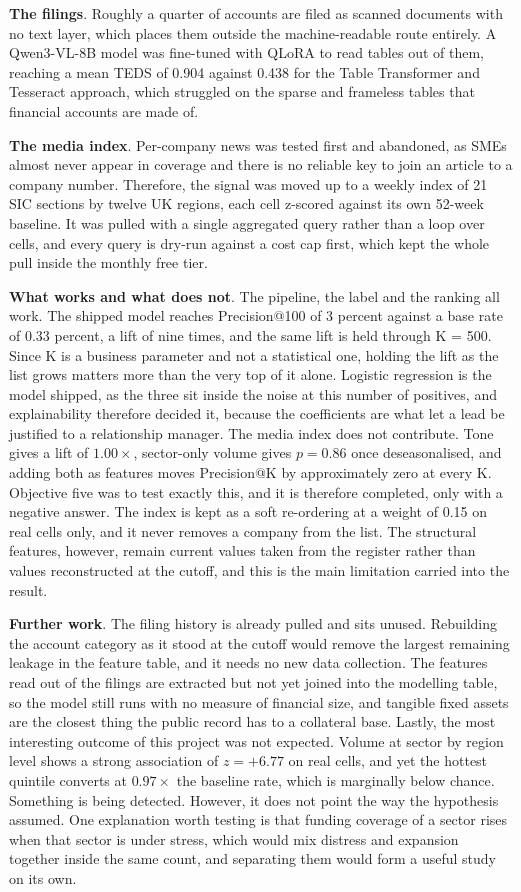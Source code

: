 \textbf{The filings}. Roughly a quarter of accounts are filed as scanned documents with no text
layer, which places them outside the machine-readable route entirely. A Qwen3-VL-8B model was
fine-tuned with QLoRA to read tables out of them, reaching a mean TEDS of 0.904 against 0.438 for
the Table Transformer and Tesseract approach, which struggled on the sparse and frameless tables
that financial accounts are made of.

\textbf{The media index}. Per-company news was tested first and abandoned, as SMEs almost never
appear in coverage and there is no reliable key to join an article to a company number. Therefore,
the signal was moved up to a weekly index of 21 SIC sections by twelve UK regions, each cell
z-scored against its own 52-week baseline. It was pulled with a single aggregated query rather
than a loop over cells, and every query is dry-run against a cost cap first, which kept the whole
pull inside the monthly free tier.

\textbf{What works and what does not}. The pipeline, the label and the ranking all work. The
shipped model reaches Precision@100 of 3 percent against a base rate of 0.33 percent, a lift of
nine times, and the same lift is held through K = 500. Since K is a business parameter and not a
statistical one, holding the lift as the list grows matters more than the very top of it alone.
Logistic regression is the model shipped, as the three sit inside the noise at this number of
positives, and explainability therefore decided it, because the coefficients are what let a lead
be justified to a relationship manager. The media index does not contribute. Tone gives a lift of
$1.00\times$, sector-only volume gives $p = 0.86$ once deseasonalised, and adding both as
features moves Precision@K by approximately zero at every K. Objective five was to test exactly
this, and it is therefore completed, only with a negative answer. The index is kept as a soft
re-ordering at a weight of 0.15 on real cells only, and it never removes a company from the list.
The structural features, however, remain current values taken from the register rather than
values reconstructed at the cutoff, and this is the main limitation carried into the result.

\textbf{Further work}. The filing history is already pulled and sits unused. Rebuilding the
account category as it stood at the cutoff would remove the largest remaining leakage in the
feature table, and it needs no new data collection. The features read out of the filings are
extracted but not yet joined into the modelling table, so the model still runs with no measure of
financial size, and tangible fixed assets are the closest thing the public record has to a
collateral base. Lastly, the most interesting outcome of this project was not expected. Volume at
sector by region level shows a strong association of $z = +6.77$ on real cells, and yet the
hottest quintile converts at $0.97\times$ the baseline rate, which is marginally below chance.
Something is being detected. However, it does not point the way the hypothesis assumed. One
explanation worth testing is that funding coverage of a sector rises when that sector is under
stress, which would mix distress and expansion together inside the same count, and separating
them would form a useful study on its own.
